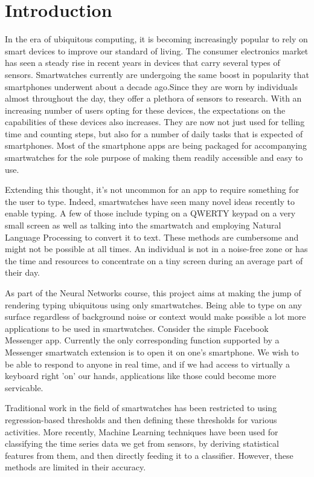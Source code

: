 \documentclass[10pt,twocolumn,letterpaper]{article}
\begin{document}
\section{Introduction}
In the era of ubiquitous computing, it is becoming increasingly popular to rely on smart devices to improve our standard of living. The consumer electronics market has seen a steady rise in recent years in devices that carry several types of sensors. Smartwatches currently are undergoing the same boost in popularity that smartphones underwent about a decade ago.Since they are worn by individuals almost throughout the day, they offer a plethora of sensors to research. With an increasing number of users opting for these devices, the expectations on the capabilities of these devices also increases. They are now not just used for telling time and counting steps, but also for a number of daily tasks that is expected of smartphones. Most of the smartphone apps are being packaged for accompanying smartwatches for the sole purpose of making them readily accessible and easy to use.

Extending this thought, it's not uncommon for an app to require something for the user to type. Indeed, smartwatches have seen many novel ideas recently to enable typing. A few of those include typing on a QWERTY keypad on a very small screen as well as talking into the smartwatch and employing Natural Language Processing to convert it to text. These methods are cumbersome and might not be possible at all times. An individual is not in a noise-free zone or has the time and resources to concentrate on a tiny screen during an average part of their day.

As part of the Neural Networks course, this project aims at making the jump of rendering typing ubiquitous using only smartwatches. Being able to type on any surface regardless of background noise or context would make possible a lot more applications to be used in smartwatches. Consider the simple Facebook Messenger app\cite{messenger}. Currently the only corresponding function supported by a Messenger smartwatch extension is to open it on one's smartphone. We wish to be able to respond to anyone in real time, and if we had access to virtually a keyboard right 'on' our hands, applications like those could become more servicable.

Traditional work in the field of smartwatches has been restricted to using regression-based thresholds and then defining these thresholds for various activities. More recently, Machine Learning techniques have been used for classifying the time series data we get from sensors, by deriving statistical features from them, and then directly feeding it to a classifier. However, these methods are limited in their accuracy.
\end{document}

